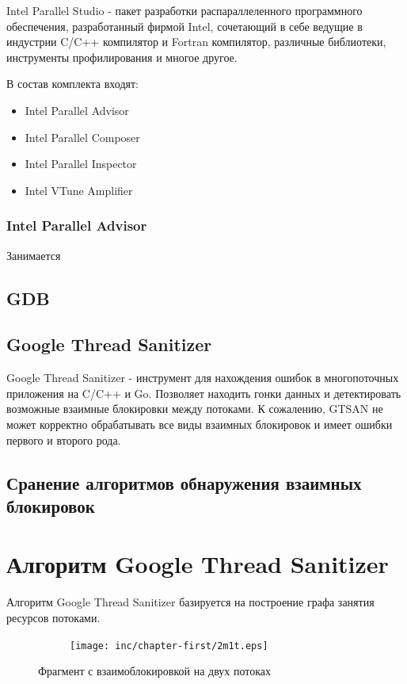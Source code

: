 Intel Parallel Studio \cite{IPSWiki} - пакет разработки распараллеленного программного обеспечения, разработанный фирмой Intel, сочетающий в себе ведущие в индустрии C/C++ компилятор и Fortran компилятор, различные библиотеки, инструменты профилирования и многое другое. 

В состав комплекта входят:

\begin{itemize}
    \item Intel Parallel Advisor
    \item Intel Parallel Composer
    \item Intel Parallel Inspector
    \item Intel VTune Amplifier
\end{itemize}

\subsubsection{Intel Parallel Advisor}

Занимается

\subsection{GDB}

\subsection{Google Thread Sanitizer}

Google Thread Sanitizer - инструмент для нахождения ошибок в многопоточных приложения на C/C++ и Go. Позволяет находить гонки данных и детектировать возможные взаимные блокировки между потоками. К сожалению, GTSAN не может корректно обрабатывать все виды взаимных блокировок и имеет ошибки первого и второго рода.

\subsection{Сранение алгоритмов обнаружения взаимных блокировок}

\section{Алгоритм Google Thread Sanitizer}

Алгоритм Google Thread Sanitizer базируется на построение графа занятия ресурсов потоками.

\begin{figure}[htbp]
    \centering
    \begin{subfigure}[h]{0.4\textwidth}
        \centering
        
    \end{subfigure}
    \hfill
    \begin{subfigure}[h]{0.4\textwidth}
        \centering
        \texttt{[image: inc/chapter-first/2m1t.eps]}
    \end{subfigure}
    \caption{Фрагмент с взаимоблокировкой на двух потоках}
    \label{fig:2m2t-d}
\end{figure}

